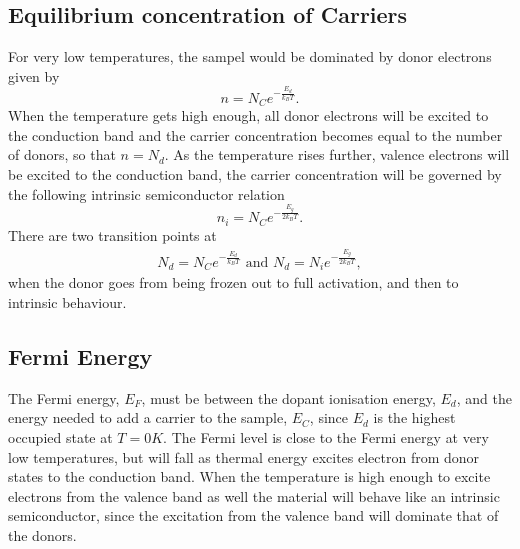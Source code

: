 \documentclass[11pt]{amsart}
\begin{document}
\subsection{Equilibrium concentration of Carriers}
For very low temperatures, the sampel would be dominated by donor electrons given by
\begin{equation}
n = N_C e^{-\frac{E_d}{k_B T}}.
\end{equation}
When the temperature gets high enough, all donor electrons will be excited to the conduction band and the carrier concentration becomes equal to the number of donors, so that $n=N_d$. As the temperature rises further, valence electrons will be excited to the conduction band, the carrier concentration will be governed by the following intrinsic semiconductor relation
\begin{equation}
n_i = N_C e^{-\frac{E_g}{2k_BT}}.
\end{equation}
There are two transition points at
\begin{align*}
N_d = N_Ce^{-\frac{E_d}{k_BT}} \text{ and } N_d = N_ie^{-\frac{E_g}{2k_BT}},
\end{align*}
when the donor goes from being frozen out to full activation, and then to intrinsic behaviour.

\subsection{Fermi Energy}
The Fermi energy, $E_F$, must be between the dopant ionisation energy, $E_d$, and the energy needed to add a carrier to the sample, $E_C$, since $E_d$ is the highest occupied state at $T = 0K$. The Fermi level is close to the Fermi energy at very low temperatures, but will fall as thermal energy excites electron from donor states to the conduction band. When the temperature is high enough to excite electrons from the valence band as well the material will behave like an intrinsic semiconductor, since the excitation from the valence band will dominate that of the donors.
\end{document}
